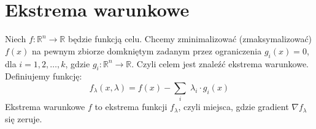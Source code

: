 \section{Ekstrema warunkowe}
Niech \( f: \mathbb{R}^n \rightarrow \mathbb{R} \) będzie funkcją celu. Chcemy zminimalizować (zmaksymalizować) \( f(x) \) na pewnym zbiorze domkniętym zadanym przez ograniczenia \( g_i(x) = 0 \), dla \( i = 1, 2, \dots, k \), gdzie \( g_i: \mathbb{R}^n \rightarrow \mathbb{R} \). Czyli celem jest znaleźć ekstrema warunkowe. Definiujemy funkcję:
\[
    f_{\lambda}(x,\lambda) = f(x) - \sum_{i}\; \lambda_i \cdot g_i(x)
\]
Ekstrema warunkowe \( f \) to ekstrema funkcji \( f_{\lambda} \), czyli miejsca, gdzie
gradient \( \nabla f_{\lambda} \) się zeruje.
